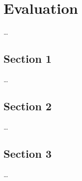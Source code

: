 
\chapter{Evaluation}
\label{ch:Evaluation}

\dots


\section{Section 1}
\label{ch:Evaluation:sec:Section1}

\dots


\section{Section 2}
\label{ch:Evaluation:sec:Section2}

\dots


\section{Section 3}
\label{ch:Evaluation:sec:Section3}

\dots